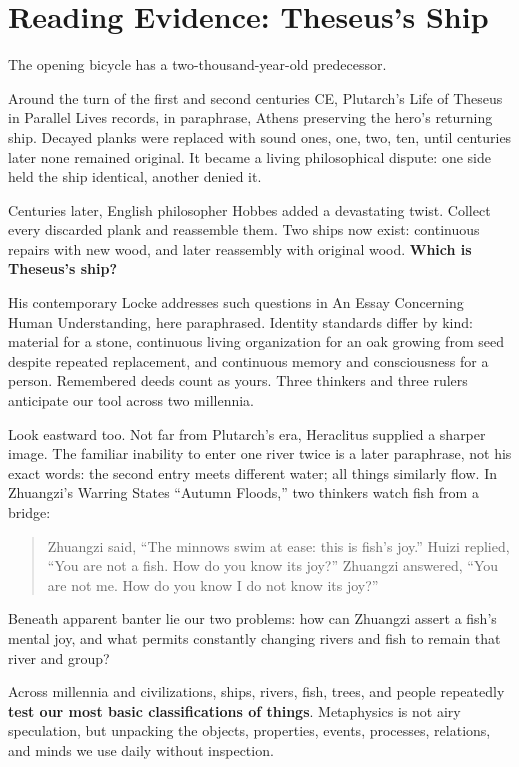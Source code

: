 \section{Reading Evidence: Theseus's Ship}
The opening bicycle has a two-thousand-year-old predecessor.

Around the turn of the first and second centuries CE, Plutarch's Life of Theseus in Parallel Lives records, in paraphrase, Athens preserving the hero's returning ship. Decayed planks were replaced with sound ones, one, two, ten, until centuries later none remained original. It became a living philosophical dispute: one side held the ship identical, another denied it.

Centuries later, English philosopher Hobbes added a devastating twist. Collect every discarded plank and reassemble them. Two ships now exist: continuous repairs with new wood, and later reassembly with original wood. \textbf{Which is Theseus's ship?}

His contemporary Locke addresses such questions in An Essay Concerning Human Understanding, here paraphrased. Identity standards differ by kind: material for a stone, continuous living organization for an oak growing from seed despite repeated replacement, and continuous memory and consciousness for a person. Remembered deeds count as yours. Three thinkers and three rulers anticipate our tool across two millennia.

Look eastward too. Not far from Plutarch's era, Heraclitus supplied a sharper image. The familiar inability to enter one river twice is a later paraphrase, not his exact words: the second entry meets different water; all things similarly flow. In Zhuangzi's Warring States ``Autumn Floods,'' two thinkers watch fish from a bridge:

\begin{quote}
Zhuangzi said, ``The minnows swim at ease: this is fish's joy.'' Huizi replied, ``You are not a fish. How do you know its joy?'' Zhuangzi answered, ``You are not me. How do you know I do not know its joy?''
\end{quote}
Beneath apparent banter lie our two problems: how can Zhuangzi assert a fish's mental joy, and what permits constantly changing rivers and fish to remain that river and group?

Across millennia and civilizations, ships, rivers, fish, trees, and people repeatedly \textbf{test our most basic classifications of things}. Metaphysics is not airy speculation, but unpacking the objects, properties, events, processes, relations, and minds we use daily without inspection.

